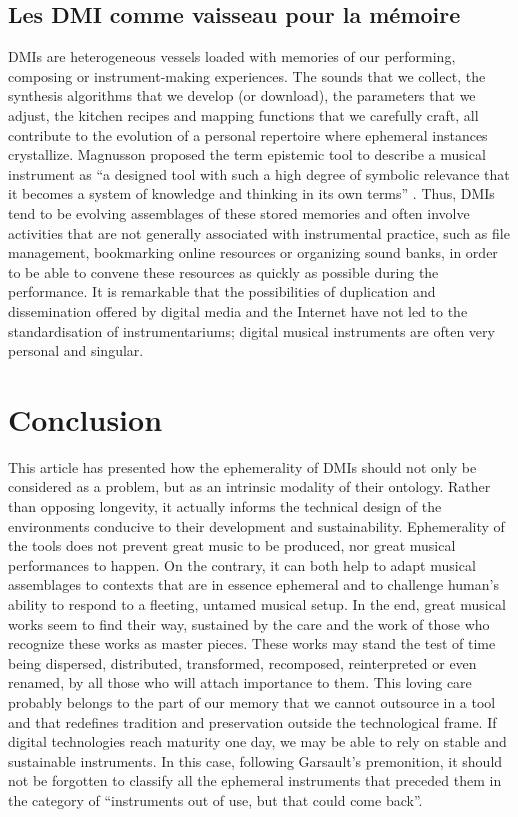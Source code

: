 \subsection{Les DMI comme vaisseau pour la mémoire}
DMIs are heterogeneous vessels loaded with memories of our performing, composing or instrument-making experiences. The sounds that we collect, the synthesis algorithms that we develop (or download), the parameters that we adjust, the kitchen recipes and mapping functions that we carefully craft, all contribute to the evolution of a personal repertoire where ephemeral instances crystallize. Magnusson proposed the term epistemic tool to describe a musical instrument as “a designed tool with such a high degree of symbolic relevance that it becomes a system of knowledge and thinking in its own terms” \cite{magnusson_epistemic_2009}.
	Thus, DMIs tend to be evolving assemblages of these stored memories and often involve activities that are not generally associated with instrumental practice, such as file management, bookmarking online resources or organizing sound banks, in order to be able to convene these resources as quickly as possible during the performance.
	It is remarkable that the possibilities of duplication and dissemination offered by digital media and the Internet have not led to the standardisation of instrumentariums; digital musical instruments are often very personal and singular.

\section{Conclusion}
This article has presented how the ephemerality of DMIs should not only be considered as a problem, but as an intrinsic modality of their ontology. Rather than opposing longevity, it actually informs the technical design of the environments conducive to their development and sustainability.
	Ephemerality of the tools does not prevent great music to be produced, nor great musical performances to happen. On the contrary, it can both help to adapt musical assemblages to contexts that are in essence ephemeral and to challenge human's ability to respond to a fleeting, untamed musical setup. In the end, great musical works seem to find their way, sustained by the care and the work of those who recognize these works as master pieces. These works may stand the test of time being dispersed, distributed, transformed, recomposed, reinterpreted or even renamed, by all those who will attach importance to them. This loving care probably belongs to the part of our memory that we cannot outsource in a tool and that redefines tradition and preservation outside the technological frame.
	If digital technologies reach maturity one day, we may be able to rely on stable and sustainable instruments. In this case, following Garsault's premonition, it should not be forgotten to classify all the ephemeral instruments that preceded them in the category of “instruments out of use, but that could come back”.